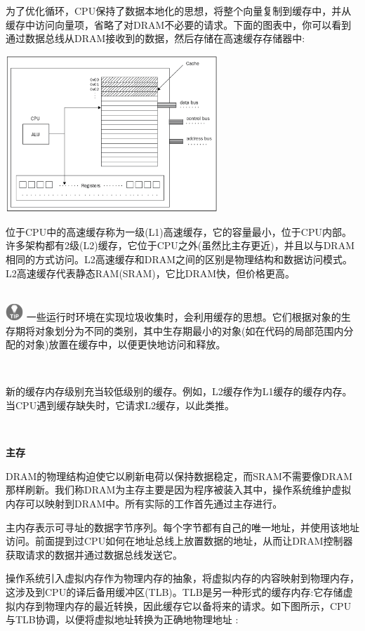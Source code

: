 为了优化循环，CPU保持了数据本地化的思想，将整个向量复制到缓存中，并从缓存中访问向量项，省略了对DRAM不必要的请求。下面的图表中，你可以看到通过数据总线从DRAM接收到的数据，然后存储在高速缓存存储器中:\par

\begin{center}
	\includegraphics[width=0.6\textwidth]{content/Section-1/Chapter-5/9}
\end{center}

位于CPU中的高速缓存称为一级(L1)高速缓存，它的容量最小，位于CPU内部。许多架构都有2级(L2)缓存，它位于CPU之外(虽然比主存更近)，并且以与DRAM相同的方式访问。L2高速缓存和DRAM之间的区别是物理结构和数据访问模式。L2高速缓存代表静态RAM(SRAM)，它比DRAM快，但价格更高。 \par

\hspace*{\fill} \\ %
\includegraphics[width=0.05\textwidth]{images/tip}
一些运行时环境在实现垃圾收集时，会利用缓存的思想。它们根据对象的生存期将对象划分为不同的类别，其中生存期最小的对象(如在代码的局部范围内分配的对象)放置在缓存中，以便更快地访问和释放。 \par
\noindent\textbf{}\ \par

新的缓存内存级别充当较低级别的缓存。例如，L2缓存作为L1缓存的缓存内存。当CPU遇到缓存缺失时，它请求L2缓存，以此类推。 \par

\noindent\textbf{}\ \par
\textbf{主存} \ \par
DRAM的物理结构迫使它以刷新电荷以保持数据稳定，而SRAM不需要像DRAM那样刷新。我们称DRAM为主存主要是因为程序被装入其中，操作系统维护虚拟内存可以映射到DRAM中。所有实际的工作首先通过主存进行。 \par
主内存表示可寻址的数据字节序列。每个字节都有自己的唯一地址，并使用该地址访问。前面提到过CPU如何在地址总线上放置数据的地址，从而让DRAM控制器获取请求的数据并通过数据总线发送它。 \par
操作系统引入虚拟内存作为物理内存的抽象，将虚拟内存的内容映射到物理内存，这涉及到CPU的译后备用缓冲区(TLB)。TLB是另一种形式的缓存内存:它存储虚拟内存到物理内存的最近转换，因此缓存它以备将来的请求。如下图所示，CPU与TLB协调，以便将虚拟地址转换为正确地物理地址 :\par

